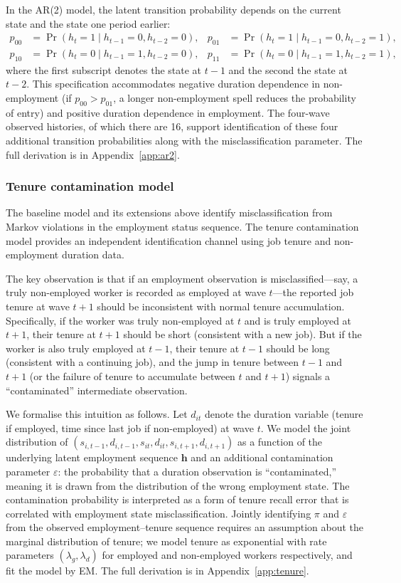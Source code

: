 In the AR(2) model, the latent transition probability depends on the current
state and the state one period earlier:
\begin{align*}
  p_{00} &= \Pr(h_t=1 \mid h_{t-1}=0, h_{t-2}=0), &
  p_{01} &= \Pr(h_t=1 \mid h_{t-1}=0, h_{t-2}=1), \\
  p_{10} &= \Pr(h_t=0 \mid h_{t-1}=1, h_{t-2}=0), &
  p_{11} &= \Pr(h_t=0 \mid h_{t-1}=1, h_{t-2}=1),
\end{align*}
where the first subscript denotes the state at $t-1$ and the second the state
at $t-2$. This specification accommodates negative duration dependence in
non-employment (if $p_{00} > p_{01}$, a longer non-employment spell reduces
the probability of entry) and positive duration dependence in employment. The
four-wave observed histories, of which there are 16, support identification of
these four additional transition probabilities along with the misclassification
parameter. The full derivation is in Appendix~\ref{app:ar2}.

\subsubsection{Tenure contamination model}\label{subsec:tenure}

The baseline model and its extensions above identify misclassification from
Markov violations in the employment status sequence. The tenure contamination
model provides an independent identification channel using job tenure and
non-employment duration data.

The key observation is that if an employment observation is misclassified---say,
a truly non-employed worker is recorded as employed at wave $t$---the reported
job tenure at wave $t+1$ should be inconsistent with normal tenure accumulation.
Specifically, if the worker was truly non-employed at $t$ and is truly employed
at $t+1$, their tenure at $t+1$ should be short (consistent with a new job).
But if the worker is also truly employed at $t-1$, their tenure at $t-1$ should
be long (consistent with a continuing job), and the jump in tenure between
$t-1$ and $t+1$ (or the failure of tenure to accumulate between $t$ and $t+1$)
signals a ``contaminated'' intermediate observation.

We formalise this intuition as follows. Let $d_{it}$ denote the duration
variable (tenure if employed, time since last job if non-employed) at wave $t$.
We model the joint distribution of $(s_{i,t-1}, d_{i,t-1}, s_{it}, d_{it},
s_{i,t+1}, d_{i,t+1})$ as a function of the underlying latent employment
sequence $\mathbf{h}$ and an additional contamination parameter $\varepsilon$:
the probability that a duration observation is ``contaminated,'' meaning it is
drawn from the distribution of the wrong employment state. The contamination
probability is interpreted as a form of tenure recall error that is correlated
with employment state misclassification. Jointly identifying $\pi$ and
$\varepsilon$ from the observed employment--tenure sequence requires an
assumption about the marginal distribution of tenure; we model tenure as
exponential with rate parameters $(\lambda_g, \lambda_d)$ for employed and
non-employed workers respectively, and fit the model by EM. The full derivation
is in Appendix~\ref{app:tenure}.

